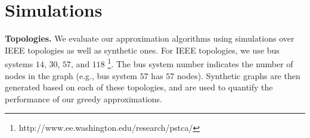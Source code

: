 \section{Simulations}
\label{sec:simulations}

\textbf{Topologies.} We evaluate our approximation algorithms using simulations over IEEE topologies as well as synthetic ones. For IEEE topologies, we use bus systems $14$, $30$, $57$, and $118$
{\footnote {\small http://www.ee.washington.edu/research/pstca/}}.  The bus system number indicates the number of nodes in the graph (e.g., bus system $57$ has $57$ nodes).
Synthetic graphs are then generated based on each of these topologies, and are used to quantify the performance of our greedy approximations.

